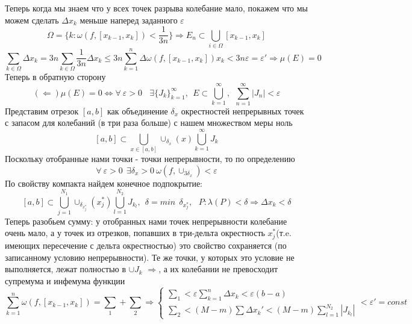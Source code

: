 \documentclass[a4paper,11pt]{article}
\renewcommand{\epsilon}{\ensuremath{\varepsilon}}
\newcommand{\SUM}{\sum\limits_{n = 1}^{\infty}}
\newcommand{\Sum}{\sum\limits_{k = 1}^n}
\newcommand{\foralle}{\forall \ \epsilon > 0 \ \ }
\begin{document}
{Теперь когда мы знаем что у всех точек разрыва колебание мало, покажем что мы можем сделать $\Delta x_k$ меньше наперед заданного $\epsilon$
\[
\Omega = \{k:  \omega(f, [x_{k - 1}, x_k]) < \dfrac{1}{3n}\} \Rightarrow E_n \subset \bigcup\limits_{i \in \Omega} [x_{k-1}, x_k]
\]
\[
\sum\limits_{k \in \Omega} \Delta x_k = 3n \sum\limits_{k \in \Omega} \dfrac{1}{3n} \Delta x_k \leq 3n \sum\limits_{k = 1}^n \Delta  \omega(f, [x_{k - 1}, x_k]) x_k < 3n \epsilon = \epsilon' \Rightarrow \mu(E) = 0
\]
Теперь в обратную сторону 
\[
(\Leftarrow) \mu(E) = 0 \Leftrightarrow \foralle  \ \ \exists \{J_k\}_{k=1}^{\infty},  \ \ E \subset \bigcup\limits_{k=1}^{\infty}, \ \  \SUM |J_n| < \epsilon
\]
Представим отрезок $[a,b]$ как объединение $\delta_x$ окрестностей непрерывных точек с запасом для колебаний (в три раза больше) с нашем множеством меры ноль
\[
[a, b] \subset \bigcup\limits_{x \in [a, b]} \cup_{\delta_x}(x) \bigcup\limits_{k = 1}^{\infty} J_k
\]
Поскольку отобранные нами точки - точки непрерывности, то по определению 
\[
\foralle \exists \delta_x >0 \ \omega(f, \cup_{3\delta_x}) < \epsilon 
\]
По свойству компакта найдем конечное подпокрытие:
\[
[a, b] \subset \bigcup\limits_{j = 1}^{N_1} \cup_{\delta_{x^*_j}}(x^*_j) \bigcup\limits_{l = 1}^{N_2} J_{k_l}, \ \ \delta = min \  \ \delta_{x^*_j}, \ \ \ P: \lambda(P) < \delta \Rightarrow \Delta x_k < \delta
\]
Теперь разобьем сумму: у отобранных нами точек непрерывности колебание очень мало, а у точек из отрезков, попавших в три-дельта окрестность $x^*_j$(т.e. имеющих пересечение с дельта окрестностью) это свойство сохраняется (по записанному условию непрерывности). Те же точки, у которых это условие не выполняется, лежат полностью в $\cup J_k$ $\Rightarrow$, а их колебании не превосходит супремума и инфемума функции
\[
\Sum \omega(f, [x_{k-1}, x_k]) = \sum_1 + \sum_2 \Rightarrow 
\begin{cases}
	\sum_1 < \epsilon \Sum \Delta x_k < \epsilon (b-a) \\
	\sum_2 < (M-m) \sum \Delta x_k'<(M-m) \sum\limits_{l = 1}^{N_2}|J_{k_l}|
\end{cases}
< \epsilon'= const
\]
}
\end{document}
